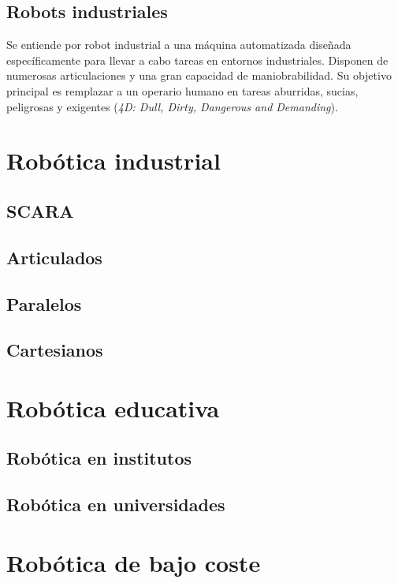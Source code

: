 \subsection{Robots industriales}
Se entiende por robot industrial a una máquina automatizada diseñada específicamente para llevar a cabo tareas en entornos industriales. 
Disponen de numerosas articulaciones y una gran capacidad de maniobrabilidad. Su objetivo principal es remplazar a un 
operario humano en tareas aburridas, sucias, peligrosas y exigentes (\textit{4D: Dull, Dirty, Dangerous and Demanding}).

\section{Robótica industrial}
\label{sec:rob_industrial}


\subsection{SCARA}
\subsection{Articulados}
\subsection{Paralelos}
\subsection{Cartesianos}

\section{Robótica educativa}
\label{sec:rob_educativa}
\subsection{Robótica en institutos}
\subsection{Robótica en universidades}

\section{Robótica de bajo coste}
\label{sec:rob_bajo:coste}

